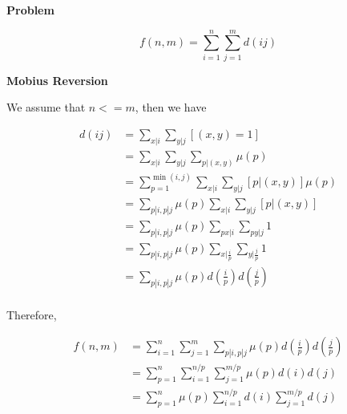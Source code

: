 \noindent\textbf{Problem}

\begin{equation*}
f(n, m) = \sum_{i=1}^{n} \sum_{j=1}^{m} d(ij)
\end{equation*}

\noindent\textbf{Mobius Reversion}

We assume that $n <= m$, then we have

\begin{equation*}
\begin{aligned}
d(ij) &= \sum_{x|i}\sum_{y|j} \left[(x, y) = 1\right] \\
&= \sum_{x|i}\sum_{y|j} \sum_{p|(x,y)} \mu(p) \\
&= \sum_{p=1}^{\min(i,j)} \sum_{x|i}\sum_{y|j} \left[p|(x, y)\right] \mu(p) \\
&= \sum_{p|i,p|j} \mu(p) \sum_{x|i}\sum_{y|j} \left[p|(x, y)\right] \\
&= \sum_{p|i,p|j} \mu(p) \sum_{px|i}\sum_{py|j} 1 \\
&= \sum_{p|i,p|j} \mu(p) \sum_{x|\frac{i}{p}}\sum_{y|\frac{j}{p}} 1 \\
&= \sum_{p|i,p|j} \mu(p) d\left(\frac{i}{p}\right) d\left(\frac{j}{p}\right) \\
\end{aligned}
\end{equation*}

Therefore, 

\begin{equation*}
\begin{aligned}
f(n, m) &= \sum_{i=1}^{n} \sum_{j=1}^{m} \sum_{p|i,p|j} \mu(p) d\left(\frac{i}{p}\right) d\left(\frac{j}{p}\right) \\
&= \sum_{p=1}^{n} \sum_{i=1}^{n/p} \sum_{j=1}^{m/p} \mu(p)d(i)d(j) \\
&= \sum_{p=1}^{n}\mu(p) \sum_{i=1}^{n/p}d(i) \sum_{j=1}^{m/p} d(j) \\
\end{aligned}
\end{equation*}


